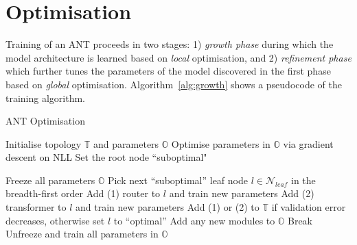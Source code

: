 \section{Optimisation}\label{sec:learning}
Training of an ANT proceeds in two stages: 1) \textit{growth phase} during which the model architecture is learned based on \textit{local} optimisation, and 2) \textit{refinement phase} which further tunes the parameters of the model discovered in the first phase based on \textit{global} optimisation. Algorithm~\ref{alg:growth} shows a pseudocode of the training algorithm.

\begin{algorithm}
	\caption{ANT Optimisation}
	\label{alg:growth}
	\footnotesize
	\begin{algorithmic}
		\State Initialise topology $\mathbb{T}$ and parameters $\mathbb{O}$
		\State Optimise parameters in $\mathbb{O}$ via gradient descent on NLL 
		\State Set the root node ``suboptimal"
		
		 
		\State Freeze all parameters $\mathbb{O}$
		\State Pick next ``suboptimal'' leaf node $l\in\mathcal{N}_{leaf}$ in the breadth-first order
		\State Add (1) router to $l$ and train new parameters 
		\State Add (2) transformer to $l$ and train new parameters
		\State Add (1) or (2) to $\mathbb{T}$ if validation error decreases, otherwise set $l$ to ``optimal''
		\State Add any new modules to $\mathbb{O}$ 
		\State Break
		\EndIf
		\EndWhile
		\State Unfreeze and train all parameters in $\mathbb{O}$
	\end{algorithmic}
\end{algorithm}


